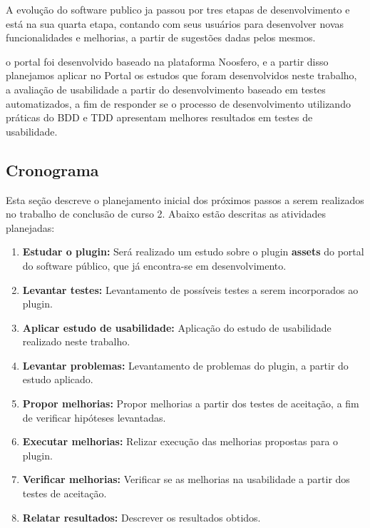 A evolução do software publico ja passou por tres etapas de desenvolvimento e está na sua quarta etapa, contando com seus usuários para desenvolver novas funcionalidades e melhorias, a partir de sugestões dadas pelos mesmos.

o portal foi desenvolvido baseado na plataforma Noosfero, e a partir disso planejamos aplicar no Portal os estudos que foram desenvolvidos neste trabalho, a avaliação de usabilidade a partir do desenvolvimento baseado em testes automatizados, a fim de responder se o processo de desenvolvimento utilizando práticas do BDD e TDD apresentam melhores resultados em testes de usabilidade.

\subsection{Cronograma}

Esta seção descreve o planejamento inicial dos próximos passos a serem realizados no trabalho de conclusão de curso 2. Abaixo estão descritas as atividades planejadas:

\begin{enumerate}
\item \textbf{Estudar o plugin:} Será realizado um estudo sobre o plugin \textbf{assets} do portal do software público, que já encontra-se em desenvolvimento.
\item \textbf{Levantar testes:} Levantamento de possíveis testes a serem incorporados ao plugin.
\item \textbf{Aplicar estudo de usabilidade:} Aplicação do estudo de usabilidade realizado neste trabalho.
\item \textbf{Levantar problemas:} Levantamento de problemas do plugin, a partir do estudo aplicado.
\item  \textbf{Propor melhorias:} Propor melhorias a partir dos testes de aceitação, a fim de verificar hipóteses levantadas.
\item \textbf{Executar melhorias:} Relizar execução das melhorias propostas para o plugin.
\item \textbf{Verificar melhorias:} Verificar se as melhorias na usabilidade a partir dos testes de aceitação.
\item \textbf{Relatar resultados:} Descrever os resultados obtidos.

\end{enumerate}
